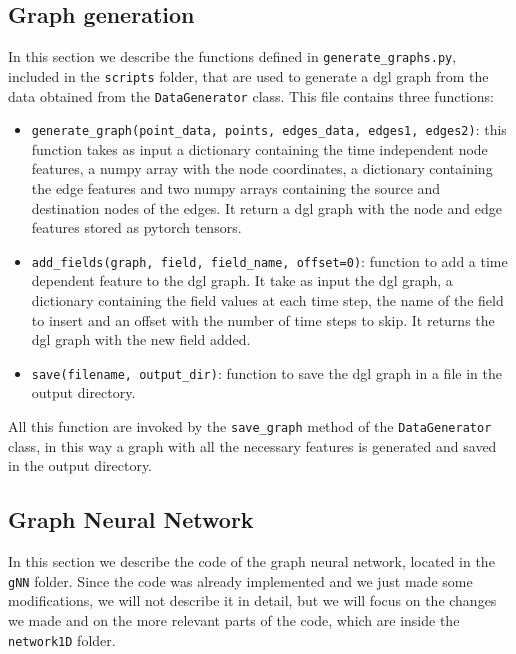 \documentclass[11pt,a4paper]{article}
\begin{document}
\subsection{Graph generation}

In this section we describe the functions defined in \texttt{generate\_graphs.py}, included in the \texttt{scripts} folder, that are used to generate a dgl graph from the data obtained from the \texttt{DataGenerator} class. This file contains three functions: 
\begin{itemize}
    \item \texttt{generate\_graph(point\_data, points, edges\_data, edges1, edges2)}: this function takes as input a dictionary containing the time independent node features, a numpy array with the node coordinates, a dictionary containing the edge features and two numpy arrays containing the source and destination nodes of the edges. It return a dgl graph with the node and edge features stored as pytorch tensors.
    \item \texttt{add\_fields(graph, field, field\_name, offset=0)}: function to add a time dependent feature to the dgl graph. It take as input the dgl graph, a dictionary containing the field values at each time step, the name of the field to insert and an offset with the number of time steps to skip. It returns the dgl graph with the new field added.
    \item \texttt{save(filename, output\_dir)}: function to save the dgl graph in a file in the output directory.
\end{itemize}

All this function are invoked by the \texttt{save\_graph} method of the \texttt{DataGenerator} class, in this way a graph with all the necessary features is generated and saved in the output directory.

\subsection{Graph Neural Network}
\label{gnn}

In this section we describe the code of the graph neural network, located in the \texttt{gNN} folder. Since the code was already implemented and we just made some modifications, we will not describe it in detail, but we will focus on the changes we made and on the more relevant parts of the code, which are inside the \texttt{network1D} folder.
\end{document}

